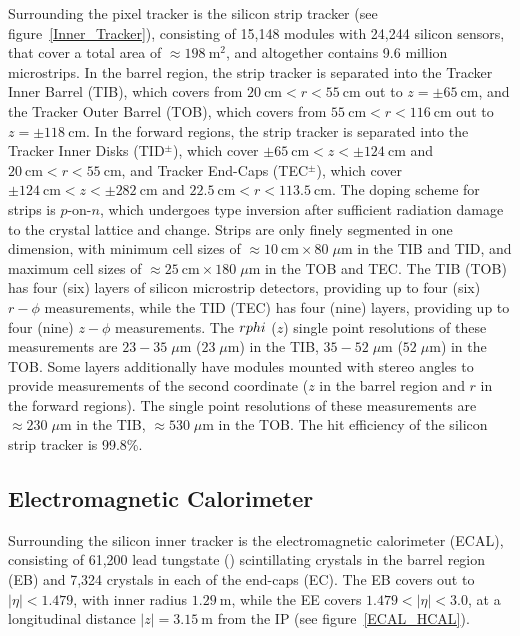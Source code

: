 Surrounding the pixel tracker is the silicon strip tracker (see figure~\ref{Inner_Tracker}), consisting of 15,148 modules with 24,244 silicon sensors, that cover a total area of $\approx \SI{198}{\m \squared}$, and altogether contains 9.6 million microstrips.
In the barrel region, the strip tracker is separated into the Tracker Inner Barrel (TIB), which covers from $\SI{20}{\cm} < r < \SI{55}{\cm}$ out to $z = \pm \SI{65}{\cm}$, and the Tracker Outer Barrel (TOB), which covers from $\SI{55}{\cm} < r < \SI{116}{\cm}$ out to $z = \pm \SI{118}{\cm}$.
In the forward regions, the strip tracker is separated into the Tracker Inner Disks (TID$^\pm$), which cover $\pm\SI{65}{\cm} < z < \pm\SI{124}{\cm}$ and $\SI{20}{\cm} < r < \SI{55}{\cm}$, and Tracker End-Caps (TEC$^\pm$), which cover $\pm\SI{124}{\cm} < z < \pm\SI{282}{\cm}$ and $\SI{22.5}{\cm} < r < \SI{113.5}{\cm}$.
The doping scheme for strips is $p$-on-$n$, which undergoes type inversion after sufficient radiation damage to the crystal lattice and change.
Strips are only finely segmented in one dimension, with minimum cell sizes of  $\approx \SI{10}{\cm} \times 80 \; \mu \si{\m}$ in the TIB and TID, and maximum cell sizes of $\approx \SI{25}{\cm} \times 180 \; \mu \si{\m}$ in the TOB and TEC.
The TIB (TOB) has four (six) layers of silicon microstrip detectors, providing up to four (six) $r-\phi$ measurements, while the TID (TEC) has four (nine) layers, providing up to four (nine) $z-\phi$ measurements.
The $r\-phi$ ($z$) single point resolutions of these measurements are $23-35 \; \mu \si{\m}$ ($23 \; \mu \si{\m}$) in the TIB, $35-52 \; \mu \si{\m}$ ($52 \; \mu \si{\m}$) in the TOB.
Some layers additionally have modules mounted with stereo angles to provide measurements of the second coordinate ($z$ in the barrel region and $r$ in the forward regions).
The single point resolutions of these measurements are $\approx 230 \; \mu \si{\m}$ in the TIB, $\approx 530 \; \mu \si{\m}$ in the TOB.
The hit efficiency of the silicon strip tracker is 99.8\%.

\subsection{Electromagnetic Calorimeter}
Surrounding the silicon inner tracker is the electromagnetic calorimeter (ECAL), consisting of 61,200 lead tungstate () scintillating crystals in the barrel region (EB) and 7,324 crystals in each of the end-caps (EC).
The EB covers out to $\vert \eta \vert < 1.479$, with inner radius $\SI{1.29}{\m}$, while the EE covers $1.479 < \vert \eta \vert < 3.0$, at a longitudinal distance $\vert z \vert = \SI{3.15}{\m}$ from the IP (see figure~\ref{ECAL_HCAL}).

